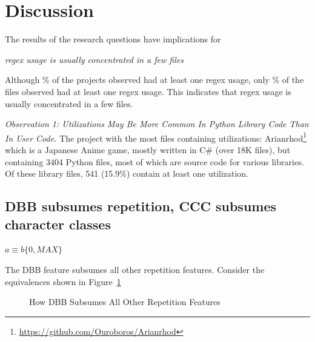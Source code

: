 \section{Discussion}
\label{sec:discussion}

The results of the research questions have implications for 


\emph{regex usage is usually concentrated in a few files}

Although \% of the projects observed had at least one regex usage, only \% of the files observed had at least one regex usage.  This indicates that regex usage is usually concentrated in a few files.  

\noindent \emph{Observation 1: Utilizations May Be More Common In Python Library Code Than In User Code. }
The project with the most files containing utilizations: Arianrhod\footnote{\url{https://github.com/Ouroboros/Arianrhod}} which is a Japanese Anime game, mostly written in C\# (over 18K files), but containing 3404 Python files, most of which are source code for various libraries.  Of these library files, 541 (15.9\%) contain at least one utilization. 




\subsection{DBB subsumes repetition, CCC subsumes character classes}




$a \equiv b \{0, MAX\}$


The DBB feature subsumes all other repetition features.  Consider the equivalences shown in Figure~\ref{fig:DBBequivalences}

\begin{figure}[tb]
\centering
{}
\caption{How DBB Subsumes All Other Repetition Features}
\label{fig:DBBequivalences}
\end{figure}

